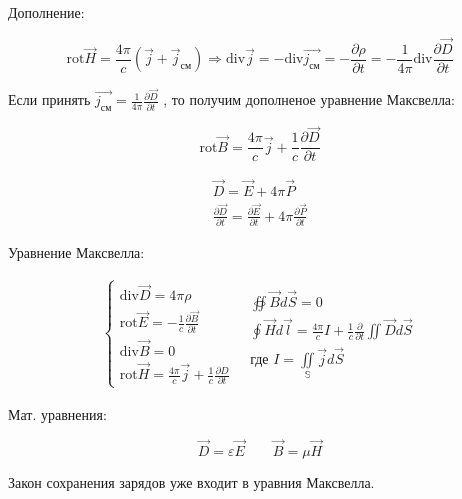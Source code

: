 Дополнение:

\[
\mathrm{rot}\vec{H}=\frac{4\pi}{c}\left( \vec{j}+\vec{j}_{\text{см}} \right)\Rightarrow \mathrm{div}\vec{j}=-\mathrm{div}\vec{j_{\text{см}}}=-\frac{\partial\rho}{\partial t}=-\frac{1}{4\pi}\mathrm{div} \frac{\partial \vec{D}}{\partial t}        
\]

Если принять \( \vec{j_{\text{см}}}=\frac{1}{4\pi}\frac{\partial \vec{D}}{\partial t}     \) , то получим дополненое уравнение Максвелла:

\[
\boxed{\mathrm{rot}\vec{B}=\frac{4\pi}{c}\vec{j}+\frac{1}{c} \frac{\partial\vec{D}}{\partial t}    }
\]

\begin{gather*}
    \vec{D}=\vec{E}+4\pi\vec{P} \\
    \frac{\partial \vec{D}}{\partial t}= \frac{\partial \vec{E}}{\partial t} +4\pi \frac{\partial \vec{P}}{\partial t}  
\end{gather*}

Уравнение Максвелла:

\[
\begin{aligned}
    \begin{cases}
        \mathrm{div}\vec{D}=4\pi\rho \\
        \mathrm{rot}\vec{E}=-\frac{1}{c} \frac{\partial\vec{B}}{\partial t} \\
        \mathrm{div}\vec{B}=0 \\
        \mathrm{rot}\vec{H}=\frac{4\pi}{c}\vec{j}+\frac{1}{c} \frac{\partial D}{\partial t}      
    \end{cases}
    \text{ }
    \begin{array}{ll}
        \oiint \vec{B}d\vec{S}=0 \\
        \oint\vec{H}d\vec{l}=\frac{4\pi}{c}I+\frac{1}{c} \frac{\partial}{\partial t}\iint \vec{D}d\vec{S} \\
        \text{где } I=\underset{\mathbb{S}}{\iint}\vec{j}d\vec{S} 
    \end{array}
\end{aligned}
\]

Мат. уравнения:

\[
\vec{D}=\varepsilon\vec{E} \qquad \vec{B}=\mu\vec{H}
\]

Закон сохранения зарядов уже входит в уравния Максвелла.